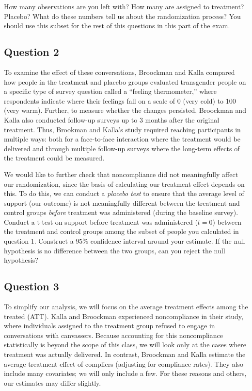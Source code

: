 \documentclass[]{article}
\begin{document}
How many observations are you left with? How many are assigned to
treatment? Placebo? What do these numbers tell us about the
randomization process? You should use this subset for the rest of this
questions in this part of the exam.

\subsection{Question 2}\label{question-2}

To examine the effect of these conversations, Broockman and Kalla
compared how people in the treatment and placebo groups evaluated
transgender people on a specific type of survey question called a
``feeling thermometer,'' where respondents indicate where their feelings
fall on a scale of 0 (very cold) to 100 (very warm). Further, to measure
whether the changes persisted, Broockman and Kalla also conducted
follow-up surveys up to 3 months after the original treatment. Thus,
Brookman and Kalla's study required reaching participants in multiple
ways: both for a face-to-face interaction where the treatment would be
delivered and through multiple follow-up surveys where the long-term
effects of the treatment could be measured.

We would like to further check that noncompliance did not meaningfully
affect our randomization, since the basis of calculating our treatment
effect depends on this. To do this, we can conduct a \emph{placebo test}
to ensure that the average level of support (our outcome) is not
meaningfully different between the treatment and control groups
\emph{before} treatment was administered (during the baseline survey).
Conduct a t-test on support before treatment was administered ($t=0$)
between the treatment and control groups among the subset of people you
calculated in question 1. Construct a 95\% confidence interval around
your estimate. If the null hypothesis is no difference between the two
groups, can you reject the null hypothesis?

\subsection{Question 3}\label{question-3}

To simplify our analysis, we will focus on the average treatment effects
among the treated (ATT). Kalla and Broockman experienced noncompliance
in their study, where individuals assigned to the treatment group
refused to engage in conversations with canvassers. Because accounting
for this noncompliance statistically is beyond the scope of this class,
we will look only at the cases where treatment was actually delivered.
In contrast, Broockman and Kalla estimate the average treatment effect
of compliers (adjusting for compliance rates). They also include many
covariates; we will only include a few. For these reasons and others,
our estimates may differ slightly.
\end{document}
